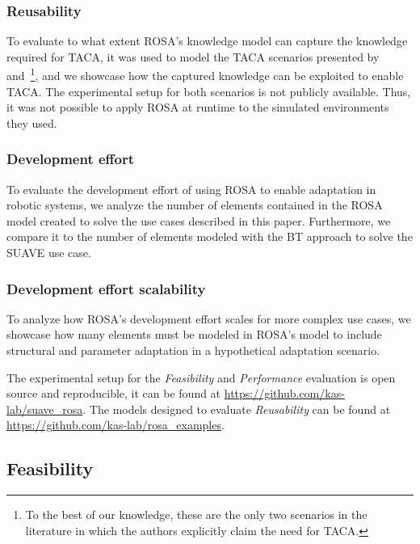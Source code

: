 \subsubsection{Reusability}
To evaluate to what extent ROSA's knowledge model can capture the knowledge required for TACA, it was used to model the TACA scenarios presented by~\cite{CAMARASoftwareArchitectureTask2020} and~\cite{braberman2018extended}\footnote{To the best of our knowledge, these are the only two scenarios in the literature in which the authors explicitly claim the need for TACA.}, and we showcase how the captured knowledge can be exploited to enable TACA\@. The experimental setup for both scenarios is not publicly available. Thus, it was not possible to apply ROSA at runtime to the simulated environments they used.

\subsubsection{Development effort} To evaluate the development effort of using ROSA to enable adaptation in robotic systems, we analyze the number of elements contained in the ROSA model created to solve the use cases described in this paper. Furthermore, we compare it to the number of elements modeled with the BT approach to solve the SUAVE use case.

\subsubsection{Development effort scalability} To analyze how ROSA's development effort scales for more complex use cases, we showcase how many elements must be modeled in ROSA's model to include structural and parameter adaptation in a hypothetical adaptation scenario.

\medskip

The experimental setup for the \emph{Feasibility} and \emph{Performance} evaluation is open source and reproducible, it can be found at
\url{https://github.com/kas-lab/suave_rosa}.
The models designed to evaluate \emph{Reusability} can be found at
\url{https://github.com/kas-lab/rosa_examples}.

\subsection{Feasibility}
